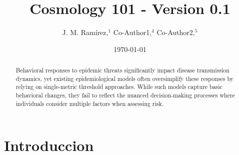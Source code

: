 \documentclass{article}\usepackage{graphicx} \usepackage{amsmath} \usepackage{colortbl}\title{Cosmology 101 - Version 0.1}
\author{J. M. Ram{\'i}rez,$^{1}$ Co-Author1,$^{4}$ Co-Author2,$^{5}$}
\date{\today}
\begin{document}
\maketitle\begin{abstract}    
Behavioral responses to epidemic threats significantly impact disease transmission dynamics, yet existing epidemiological models often oversimplify these responses by relying on single-metric threshold approaches. While such models capture basic behavioral changes, they fail to reflect the nuanced decision-making processes where individuals consider multiple factors when assessing risk.         %
\end{abstract}\section{Introduccion}
\end{document}
